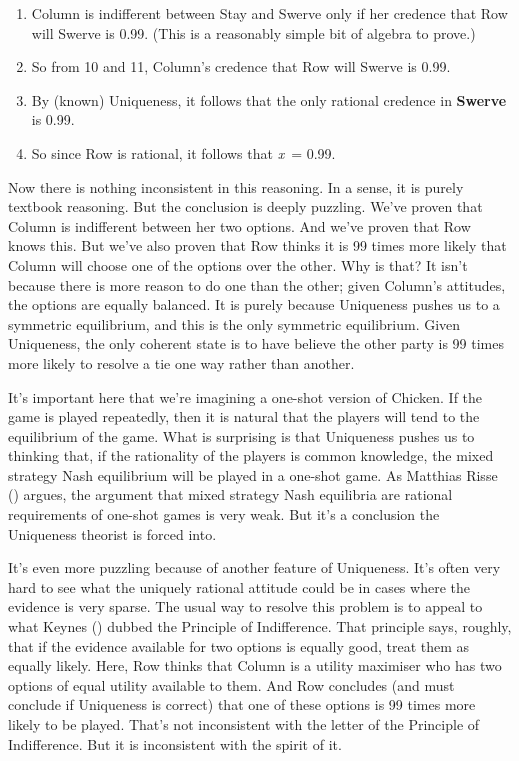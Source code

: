 \documentclass[
  10pt,
  letterpaper,
  DIV=11,
  numbers=noendperiod,
  twoside]{scrartcl}
\begin{document}
\begin{enumerate}
  what Column will do, it must be that Column is indifferent between
  Stay and Swerve given her (i.e., Column's) credences about what Row
  will do.\footnote{If Column was not indifferent between their options,
    the knowledge Row has by step 6 would be sufficient to deduce with
    certainty what Column will do. But at step 9 we showed that Row does
    not know what Column will do.}
\item
  Column is indifferent between Stay and Swerve only if her credence
  that Row will Swerve is 0.99. (This is a reasonably simple bit of
  algebra to prove.)
\item
  So from 10 and 11, Column's credence that Row will Swerve is 0.99.
\item
  By (known) Uniqueness, it follows that the only rational credence in
  \textbf{Swerve} is 0.99.
\item
  So since Row is rational, it follows that \emph{x}~= 0.99.
\end{enumerate}

Now there is nothing inconsistent in this reasoning. In a sense, it is
purely textbook reasoning. But the conclusion is deeply puzzling. We've
proven that Column is indifferent between her two options. And we've
proven that Row knows this. But we've also proven that Row thinks it is
99 times more likely that Column will choose one of the options over the
other. Why is that? It isn't because there is more reason to do one than
the other; given Column's attitudes, the options are equally balanced.
It is purely because Uniqueness pushes us to a symmetric equilibrium,
and this is the only symmetric equilibrium. Given Uniqueness, the only
coherent state is to have believe the other party is 99 times more
likely to resolve a tie one way rather than another.

It's important here that we're imagining a one-shot version of Chicken.
If the game is played repeatedly, then it is natural that the players
will tend to the equilibrium of the game. What is surprising is that
Uniqueness pushes us to thinking that, if the rationality of the players
is common knowledge, the mixed strategy Nash equilibrium will be played
in a one-shot game. As Matthias Risse ()
argues, the argument that mixed strategy Nash equilibria are rational
requirements of one-shot games is very weak. But it's a conclusion the
Uniqueness theorist is forced into.

It's even more puzzling because of another feature of Uniqueness. It's
often very hard to see what the uniquely rational attitude could be in
cases where the evidence is very sparse. The usual way to resolve this
problem is to appeal to what Keynes ()
dubbed the Principle of Indifference. That principle says, roughly, that
if the evidence available for two options is equally good, treat them as
equally likely. Here, Row thinks that Column is a utility maximiser who
has two options of equal utility available to them. And Row concludes
(and must conclude if Uniqueness is correct) that one of these options
is 99 times more likely to be played. That's not inconsistent with the
letter of the Principle of Indifference. But it is inconsistent with the
spirit of it.
\end{document}
